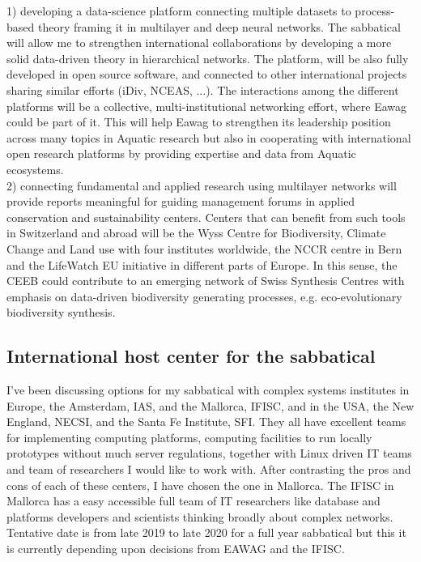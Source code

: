 \documentclass[authoryear,1p,12pt]{elsarticle}
\begin{document}
1) developing a data-science platform connecting multiple datasets to
process-based theory framing it in multilayer and deep neural
networks. The sabbatical will allow me to strengthen international
collaborations by developing a more solid data-driven theory in
hierarchical networks. The platform, will be also fully developed in
open source software, and connected to other international projects
sharing similar efforts (iDiv, NCEAS, ...). The interactions among the
different platforms will be a collective, multi-institutional
networking effort, where Eawag could be part of it. This will help
Eawag to strengthen its leadership position across many topics in
Aquatic research but also in cooperating with international open
research platforms by providing expertise and data from Aquatic
ecosystems.
\\
2) connecting fundamental and applied research using multilayer
networks will provide reports meaningful for guiding management forums
in applied conservation and sustainability centers. Centers that can
benefit from such tools in Switzerland and abroad will be the Wyss
Centre for Biodiversity, Climate Change and Land use with four
institutes worldwide, the NCCR centre in Bern and the LifeWatch
EU initiative in different parts of Europe. In this sense, the CEEB
could contribute to an emerging network of Swiss Synthesis Centres
with emphasis on data-driven biodiversity generating processes,
e.g. eco-evolutionary biodiversity synthesis.

\subsection{{\bf International host center for the sabbatical}}

I've been discussing options for my sabbatical with complex systems
institutes in Europe, the Amsterdam, IAS, and the Mallorca, IFISC, and
in the USA, the New England, NECSI, and the Santa Fe Institute,
SFI. They all have excellent teams for implementing computing
platforms, computing facilities to run locally prototypes without much
server regulations, together with Linux driven IT teams and team of
researchers I would like to work with. After contrasting the pros and
cons of each of these centers, I have chosen the one in Mallorca. The
IFISC in Mallorca has a easy accessible full team of IT researchers
like database and platforms developers and scientists thinking broadly
about complex networks. Tentative date is from late 2019 to late 2020
for a full year sabbatical but this it is currently depending upon
decisions from EAWAG and the IFISC.
\end{document}
